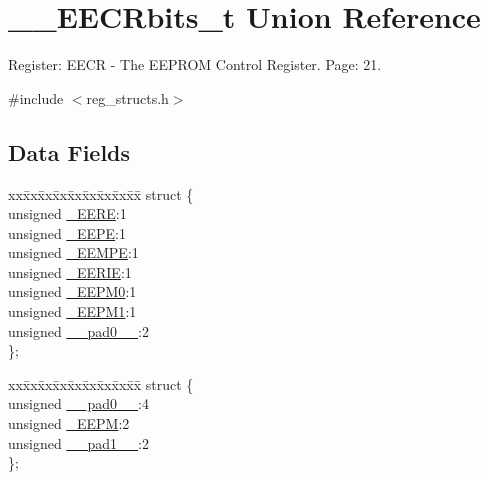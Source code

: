 \hypertarget{union_____e_e_c_rbits__t}{\section{\+\_\+\+\_\+\+E\+E\+C\+Rbits\+\_\+t Union Reference}
\label{union_____e_e_c_rbits__t}
}


Register\+: E\+E\+C\+R -\/ The E\+E\+P\+R\+O\+M Control Register. Page\+: 21.  




{\ttfamily \#include $<$reg\+\_\+structs.\+h$>$}

\subsection*{Data Fields}
\begin{DoxyCompactItemize}
\item 
\begin{tabbing}
xx\=xx\=xx\=xx\=xx\=xx\=xx\=xx\=xx\=\kill
struct \{\\
\>unsigned \hyperlink{union_____e_e_c_rbits__t_a359666ae317fb19e22532ca95c9ceb00}{\_EERE}:1\\
\>unsigned \hyperlink{union_____e_e_c_rbits__t_a3e9439f92f80a14f82bf3bef53f4526d}{\_EEPE}:1\\
\>unsigned \hyperlink{union_____e_e_c_rbits__t_a01f4d1528e11166bf0f4f603211e69ae}{\_EEMPE}:1\\
\>unsigned \hyperlink{union_____e_e_c_rbits__t_aa1f71b84eb4aacca790b6da1121e7a35}{\_EERIE}:1\\
\>unsigned \hyperlink{union_____e_e_c_rbits__t_ae4ad8b10d6620dd0f333a69a6f60a17f}{\_EEPM0}:1\\
\>unsigned \hyperlink{union_____e_e_c_rbits__t_a04908b3a010bb473339a282f641c2bf0}{\_EEPM1}:1\\
\>unsigned \hyperlink{union_____e_e_c_rbits__t_a93f9aefb9c2f57aee765328c81531b76}{\_\_pad0\_\_}:2\\
\}; \\

\end{tabbing}\item 
\begin{tabbing}
xx\=xx\=xx\=xx\=xx\=xx\=xx\=xx\=xx\=\kill
struct \{\\
\>unsigned \hyperlink{union_____e_e_c_rbits__t_a93f9aefb9c2f57aee765328c81531b76}{\_\_pad0\_\_}:4\\
\>unsigned \hyperlink{union_____e_e_c_rbits__t_a5a6b797df7d4a90e560597d16e7fe1fb}{\_EEPM}:2\\
\>unsigned \hyperlink{union_____e_e_c_rbits__t_ae3e3c7136f72334202a33a7d1fcfd109}{\_\_pad1\_\_}:2\\
\}; \\


\end{tabbing}
\end{DoxyCompactItemize}
